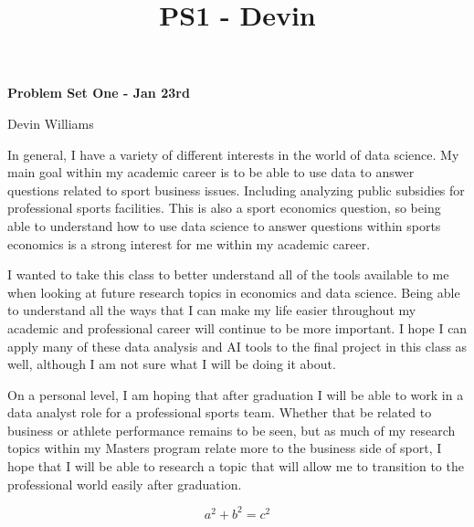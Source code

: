 



\title{PS1 - Devin}




\vspace*{-30mm}
\raggedright
\begin{Large}
    \textsf{\textbf{Problem Set One - Jan 23rd}}
    
        Devin Williams
\end{Large}

\begin{tcolorbox}[
    title={My Interests in Economics and Data Science},
    colback=white,
    colframe=black,
]
    

\setlength{\parindent}{20pt} %
\doublespacing %

In general, I have a variety of different interests in the world of data science. My main goal within my academic career is to be able to use data to answer questions related to sport business issues. Including analyzing public subsidies for professional sports facilities. This is also a sport economics question, so being able to understand how to use data science to answer questions within sports economics is a strong interest for me within my academic career. 

I wanted to take this class to better understand all of the tools available to me when looking at future research topics in economics and data science. Being able to understand all the ways that I can make my life easier throughout my academic and professional career will continue to be more important. I hope I can apply many of these data analysis and AI tools to the final project in this class as well, although I am not sure what I will be doing it about. 

On a personal level,  I am hoping that after graduation I will be able to work in a data analyst role for a professional sports team. Whether that be related to business or athlete performance remains to be seen, but as much of my research topics within my Masters program relate more to the business side of sport, I hope that I will be able to research a topic that will allow me to transition to the professional world easily after graduation. 
\end{tcolorbox}

\begin{tcolorbox} [
    title={Equation},
    colback=white,
    colframe=black,
    top=0mm
]
    \[ a^2 + b^2 = c^2 \]
\end{tcolorbox}







